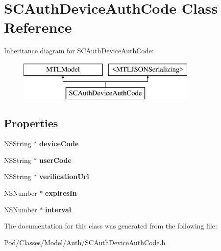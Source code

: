 \hypertarget{interface_s_c_auth_device_auth_code}{}\section{S\+C\+Auth\+Device\+Auth\+Code Class Reference}
\label{interface_s_c_auth_device_auth_code}
Inheritance diagram for S\+C\+Auth\+Device\+Auth\+Code\+:\begin{figure}[H]
\begin{center}
\leavevmode
\includegraphics[height=2.000000cm]{interface_s_c_auth_device_auth_code}
\end{center}
\end{figure}
\subsection*{Properties}
\begin{DoxyCompactItemize}
\item 
N\+S\+String $\ast$ {\bfseries device\+Code}\hypertarget{interface_s_c_auth_device_auth_code_a61b0d7aee126e662ed1bb5c4b61e9b13}{}\label{interface_s_c_auth_device_auth_code_a61b0d7aee126e662ed1bb5c4b61e9b13}

\item 
N\+S\+String $\ast$ {\bfseries user\+Code}\hypertarget{interface_s_c_auth_device_auth_code_acff73cf20ea92607f9591285e4f59b87}{}\label{interface_s_c_auth_device_auth_code_acff73cf20ea92607f9591285e4f59b87}

\item 
N\+S\+String $\ast$ {\bfseries verification\+Url}\hypertarget{interface_s_c_auth_device_auth_code_adfe9933bfee74361608ded9f3e17c0f2}{}\label{interface_s_c_auth_device_auth_code_adfe9933bfee74361608ded9f3e17c0f2}

\item 
N\+S\+Number $\ast$ {\bfseries expires\+In}\hypertarget{interface_s_c_auth_device_auth_code_aaf12b52441aee229333f0e9b2ab03194}{}\label{interface_s_c_auth_device_auth_code_aaf12b52441aee229333f0e9b2ab03194}

\item 
N\+S\+Number $\ast$ {\bfseries interval}\hypertarget{interface_s_c_auth_device_auth_code_ae2387b79e9ab5356520b4418a496c10a}{}\label{interface_s_c_auth_device_auth_code_ae2387b79e9ab5356520b4418a496c10a}

\end{DoxyCompactItemize}


The documentation for this class was generated from the following file\+:\begin{DoxyCompactItemize}
\item 
Pod/\+Classes/\+Model/\+Auth/S\+C\+Auth\+Device\+Auth\+Code.\+h\end{DoxyCompactItemize}
